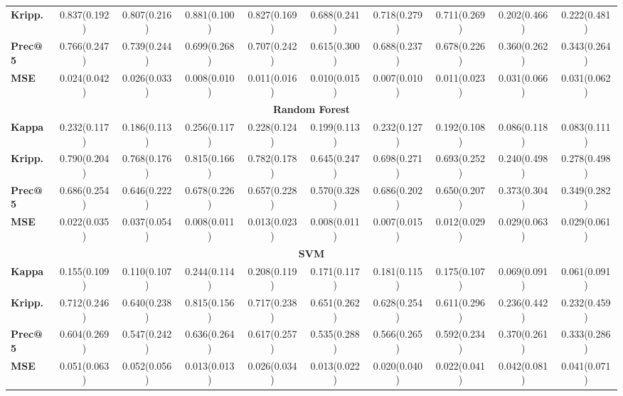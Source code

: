 \documentclass{article}
\begin{document}
\begin{sidewaystable}[!htbp]
\begin{tabular}{@{}lccccccccc@{}}
\textbf{Kripp.} & 0.837(0.192) & 0.807(0.216) & 0.881(0.100) & 0.827(0.169) & 0.688(0.241) & 0.718(0.279) & 0.711(0.269) & 0.202(0.466) & 0.222(0.481) \\
\textbf{Prec@5} & 0.766(0.247) & 0.739(0.244) & 0.699(0.268) & 0.707(0.242) & 0.615(0.300) & 0.688(0.237) & 0.678(0.226) & 0.360(0.262) & 0.343(0.264) \\
\textbf{MSE} & 0.024(0.042) & 0.026(0.033) & 0.008(0.010) & 0.011(0.016) & 0.010(0.015) & 0.007(0.010) & 0.011(0.023) & 0.031(0.066) & 0.031(0.062) \\
\midrule
\multicolumn{10}{c}{\textbf{Random Forest}}\\
\midrule
\textbf{Kappa} & 0.232(0.117) & 0.186(0.113) & 0.256(0.117) & 0.228(0.124) & 0.199(0.113) & 0.232(0.127) & 0.192(0.108) & 0.086(0.118) & 0.083(0.111) \\
\textbf{Kripp.} & 0.790(0.204) & 0.768(0.176) & 0.815(0.166) & 0.782(0.178) & 0.645(0.247) & 0.698(0.271) & 0.693(0.252) & 0.240(0.498) & 0.278(0.498) \\
\textbf{Prec@5} & 0.686(0.254) & 0.646(0.222) & 0.678(0.226) & 0.657(0.228) & 0.570(0.328) & 0.686(0.202) & 0.650(0.207) & 0.373(0.304) & 0.349(0.282) \\
\textbf{MSE} & 0.022(0.035) & 0.037(0.054) & 0.008(0.011) & 0.013(0.023) & 0.008(0.011) & 0.007(0.015) & 0.012(0.029) & 0.029(0.063) & 0.029(0.061) \\
\midrule
\multicolumn{10}{c}{\textbf{SVM}}\\
\midrule
\textbf{Kappa} & 0.155(0.109) & 0.110(0.107) & 0.244(0.114) & 0.208(0.119) & 0.171(0.117) & 0.181(0.115) & 0.175(0.107) & 0.069(0.091) & 0.061(0.091) \\
\textbf{Kripp.} & 0.712(0.246) & 0.640(0.238) & 0.815(0.156) & 0.717(0.238) & 0.651(0.262) & 0.628(0.254) & 0.611(0.296) & 0.236(0.442) & 0.232(0.459) \\
\textbf{Prec@5} & 0.604(0.269) & 0.547(0.242) & 0.636(0.264) & 0.617(0.257) & 0.535(0.288) & 0.566(0.265) & 0.592(0.234) & 0.370(0.261) & 0.333(0.286) \\
\textbf{MSE} & 0.051(0.063) & 0.052(0.056) & 0.013(0.013) & 0.026(0.034) & 0.013(0.022) & 0.020(0.040) & 0.022(0.041) & 0.042(0.081) & 0.041(0.071) \\
\bottomrule
\end{tabular}
\end{sidewaystable}
\end{document}
